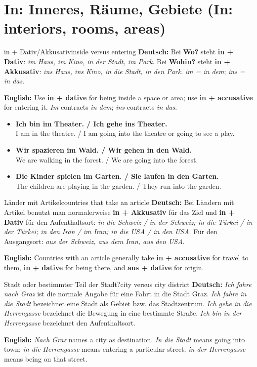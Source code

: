 \documentclass[a4paper,11pt]{article}
\newcommand{\GermanText}[1]{\textbf{Deutsch: }#1\par}
\newcommand{\EnglishText}[1]{{\small\color{SoftGray}\textbf{English: }#1\par}}
\newcommand{\ExampleItem}[2]{\item \textbf{#1}\\{\small\color{SoftGray}#2}}
\begin{document}
\section{In: Inneres, Räume, Gebiete (In: interiors, rooms, areas)}
\begin{grammarentry}{in + Dativ/Akkusativ}{inside versus entering}
\GermanText{Bei \textbf{Wo?} steht \textbf{in + Dativ}: \emph{im Haus, im Kino, in der Stadt, im Park}. Bei \textbf{Wohin?} steht \textbf{in + Akkusativ}: \emph{ins Haus, ins Kino, in die Stadt, in den Park}. \emph{im = in dem}; \emph{ins = in das}.}
\EnglishText{Use \textbf{in + dative} for being inside a space or area; use \textbf{in + accusative} for entering it. \emph{Im} contracts \emph{in dem}; \emph{ins} contracts \emph{in das}.}
\end{grammarentry}
\begin{exbox}\begin{itemize}
\ExampleItem{Ich bin im Theater. / Ich gehe ins Theater.}{I am in the theatre. / I am going into the theatre or going to see a play.}
\ExampleItem{Wir spazieren im Wald. / Wir gehen in den Wald.}{We are walking in the forest. / We are going into the forest.}
\ExampleItem{Die Kinder spielen im Garten. / Sie laufen in den Garten.}{The children are playing in the garden. / They run into the garden.}
\end{itemize}\end{exbox}
\begin{grammarentry}{Länder mit Artikel}{countries that take an article}
\GermanText{Bei Ländern mit Artikel benutzt man normalerweise \textbf{in + Akkusativ} für das Ziel und \textbf{in + Dativ} für den Aufenthaltsort: \emph{in die Schweiz / in der Schweiz; in die Türkei / in der Türkei; in den Iran / im Iran; in die USA / in den USA}. Für den Ausgangsort: \emph{aus der Schweiz, aus dem Iran, aus den USA}.}
\EnglishText{Countries with an article generally take \textbf{in + accusative} for travel to them, \textbf{in + dative} for being there, and \textbf{aus + dative} for origin.}
\end{grammarentry}
\begin{grammarentry}{Stadt oder bestimmter Teil der Stadt?}{city versus city district}
\GermanText{\emph{Ich fahre nach Graz} ist die normale Angabe für eine Fahrt in die Stadt Graz. \emph{Ich fahre in die Stadt} bezeichnet eine Stadt als Gebiet bzw. das Stadtzentrum. \emph{Ich gehe in die Herrengasse} bezeichnet die Bewegung in eine bestimmte Straße. \emph{Ich bin in der Herrengasse} bezeichnet den Aufenthaltsort.}
\EnglishText{\emph{Nach Graz} names a city as destination. \emph{In die Stadt} means going into town; \emph{in die Herrengasse} means entering a particular street; \emph{in der Herrengasse} means being on that street.}
\end{grammarentry}
\end{document}
